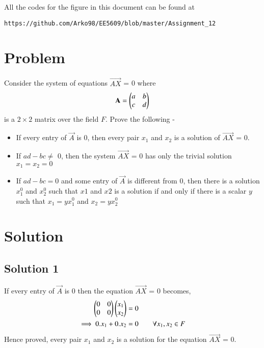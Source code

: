\documentclass[journal,12pt,twocolumn]{IEEEtran}
\begin{document}
All the codes for the figure in this document can be found at
\begin{lstlisting}
https://github.com/Arko98/EE5609/blob/master/Assignment_12
\end{lstlisting}

\section{\textbf{Problem}}
Consider the system of equations $\vec{AX}$ = 0 where
\begin{align*}
    \mathbf{A} = \begin{pmatrix}a&b\\c&d\end{pmatrix}
\end{align*}
is a $2\times2$ matrix over the field $F$. Prove the following - 
\begin{itemize}
    \item If every entry of $\vec{A}$ is 0, then every pair $x_1$ and $x_2$ is a solution of $\vec{AX}$ = 0.
    \item If $ad - bc \not=$ 0, then the system $\vec{AX}$ = 0 has only the trivial solution $x_1 = x_2 = 0$
    \item If $ad - bc = 0$ and some entry of $\vec{A}$ is different from 0, then there is a solution $x_1^0$ and $x_2^0$ such that $x1$ and  $x2$ is a solution if and only if there is a scalar $y$ such that $x_1 = yx_1^0$ and $x_2 = yx_2^0$
\end{itemize}
\section{\textbf{Solution}}
\subsection{Solution 1}
If every entry of $\vec{A}$ is 0 then the equation $\vec{AX}$ = 0 becomes,
\begin{align}
\begin{pmatrix}0&0\\0&0\end{pmatrix}\begin{pmatrix}x_1\\x_2\end{pmatrix} &=0\\
\implies0.x_1+0.x_2 &= 0 \qquad{\text{$\forall x_1,x_2 \in F$}}
\end{align}
Hence proved, every pair $x_1$ and $x_2$ is a solution for the equation $\vec{AX}$ = 0.
\end{document}

